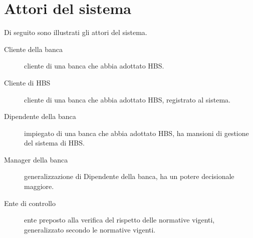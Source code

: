 \section{Attori del sistema}

Di seguito sono illustrati gli attori del sistema.

\begin{description}
	\item[Cliente della banca]
		cliente di una banca che abbia adottato HBS.

	\item[Cliente di HBS]
		cliente di una banca che abbia adottato HBS, registrato al sistema.

	\item[Dipendente della banca]
		impiegato di una banca che abbia adottato HBS, ha mansioni di gestione del sistema di HBS.

	\item[Manager della banca]
		generalizzazione di Dipendente della banca, ha un potere decisionale maggiore.

	\item[Ente di controllo]
		ente preposto alla verifica del rispetto delle normative vigenti, generalizzato secondo le normative vigenti.
\end{description}
